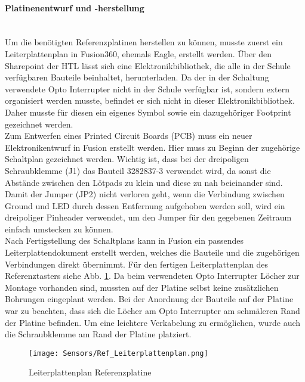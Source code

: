 \paragraph{Platinenentwurf und -herstellung} \mbox{}\\
Um die benötigten Referenzplatinen herstellen zu können, musste zuerst ein Leiterplattenplan in Fusion360, ehemals Eagle, erstellt werden. Über den Sharepoint der HTL lässt sich eine Elektronikbibliothek, die alle in der Schule verfügbaren Bauteile beinhaltet, herunterladen. Da der in der Schaltung verwendete Opto Interrupter nicht in der Schule verfügbar ist, sondern extern organisiert werden musste, befindet er sich nicht in dieser Elektronikbibliothek. Daher musste für diesen ein eigenes Symbol sowie ein dazugehöriger Footprint gezeichnet werden.\\
Zum Entwerfen eines Printed Circuit Boards (PCB) muss ein neuer Elektronikentwurf in Fusion erstellt werden. Hier muss zu Beginn der zugehörige Schaltplan gezeichnet werden. Wichtig ist, dass bei der dreipoligen Schraubklemme (J1) das Bauteil 3282837-3 verwendet wird, da sonst die Abstände zwischen den Lötpads zu klein und diese zu nah beieinander sind. Damit der Jumper (JP2) nicht verloren geht, wenn die Verbindung zwischen Ground und LED durch dessen Entfernung aufgehoben werden soll, wird ein dreipoliger Pinheader verwendet, um den Jumper für den gegebenen Zeitraum einfach umstecken zu können.\\
Nach Fertigstellung des Schaltplans kann in Fusion ein passendes Leiterplattendokument erstellt werden, welches die Bauteile und die zugehörigen Verbindungen direkt übernimmt. Für den fertigen Leiterplattenplan des Referenztasters siehe Abb. \ref{Ref_LPPlan}. Da beim verwendeten Opto Interrupter Löcher zur Montage vorhanden sind, mussten auf der Platine selbst keine zusätzlichen Bohrungen eingeplant werden. Bei der Anordnung der Bauteile auf der Platine war zu beachten, dass sich die Löcher am Opto Interrupter am schmäleren Rand der Platine befinden. Um eine leichtere Verkabelung zu ermöglichen, wurde auch die Schraubklemme am Rand der Platine platziert.

\begin{figure}[H]
    \centering
    \texttt{[image: Sensors/Ref\_Leiterplattenplan.png]}
    \caption{Leiterplattenplan Referenzplatine}
    \label{Ref_LPPlan}
\end{figure}

